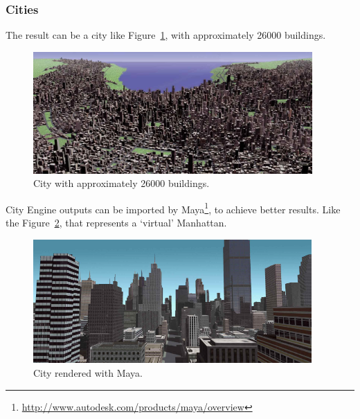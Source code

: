 
\subsubsection{Cities} %
\label{ssub:Cities1}

The result can be a city like Figure~\ref{fig:bigCity}, with approximately 26000 buildings.

\begin{figure}[htbp]
  \centering
  \includegraphics[width=0.95\textwidth]{img/Procedural-Modeling-of-Cities/City.png}
  \caption{City with approximately 26000 buildings.}
  \label{fig:bigCity}
\end{figure}

City Engine outputs can be imported by Maya\footnote{\url{http://www.autodesk.com/products/maya/overview}}, to achieve better results. Like the Figure~\ref{fig:cityMaya}, that represents a ‘virtual’ Manhattan.

\begin{figure}[htbp]
  \centering
  \includegraphics[width=0.95\textwidth]{img/Procedural-Modeling-of-Cities/City_Maya.png}
  \caption{City rendered with Maya.}
  \label{fig:cityMaya}
\end{figure}

